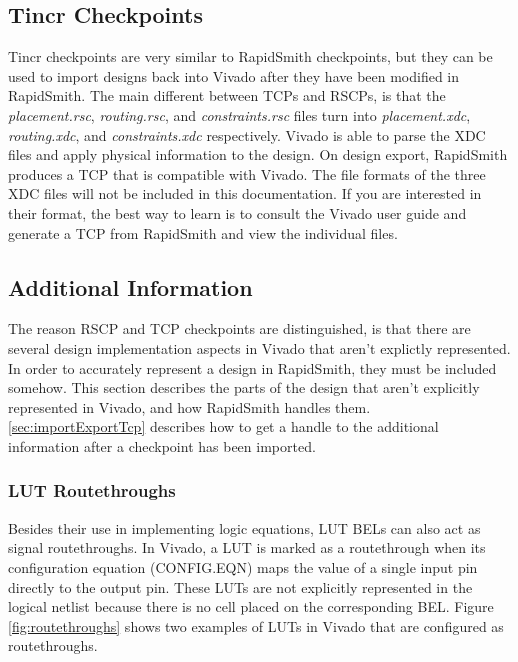\documentclass[10pt]{article}
\begin{document}
\subsection{Tincr Checkpoints} \label{sec:tcp}
Tincr checkpoints are very similar to RapidSmith checkpoints, but they can be
used to import designs back into Vivado after they have been modified in
RapidSmith. The main different between TCPs and RSCPs, is that the
\textit{placement.rsc}, \textit{routing.rsc}, and \textit{constraints.rsc} files
turn into \textit{placement.xdc}, \textit{routing.xdc}, and \textit{constraints.xdc}
respectively. Vivado is able to parse the XDC files and apply physical
information to the design. On design export, RapidSmith produces
a TCP that is compatible with Vivado. The file formats of the three XDC files
will not be included in this documentation. If you are interested in their
format, the best way to learn is to consult the Vivado user guide and generate a
TCP from RapidSmith and view the individual files.

\subsection{Additional Information} \label{sec:additionalInfo}
The reason RSCP and TCP checkpoints are distinguished, is that there are
several design implementation aspects in Vivado that aren't explictly
represented. In order to accurately represent a design in RapidSmith, they
must be included somehow. This section describes the parts of the design that
aren't explicitly represented in Vivado, and how RapidSmith handles them.
\autoref{sec:importExportTcp} describes how to get a handle to the additional
information after a checkpoint has been imported.

\subsubsection{LUT Routethroughs}
Besides their use in implementing logic equations, LUT BELs can also act as
signal routethroughs. In Vivado, a LUT is marked as a  routethrough when its
configuration equation (CONFIG.EQN) maps the value of a single input pin
directly to the output pin. These LUTs are not explicitly represented in the
logical netlist because there is no cell placed on the corresponding BEL. Figure
\ref{fig:routethroughs} shows two examples of LUTs in Vivado that are configured
as routethroughs.
\end{document}
